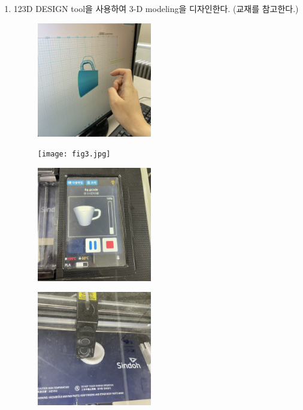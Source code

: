 \documentclass[a4paper, 10pt, nanum]{CSUniSchoolLabReport}
\begin{document}
\begin{enumerate}[label=\arabic*.]
	\item 123D DESIGN tool을 사용하여 3-D modeling을 디자인한다. (교재를 참고한다.)
	\begin{figure}[htb!]
		\centering
		\begin{minipage}{.5\textwidth}
			\centering
			\includegraphics[width=5cm]{fig2.jpg}
			\label{fig:2}
		\end{minipage}%
		\begin{minipage}{.5\textwidth}
			\centering
			\texttt{[image: fig3.jpg]}
			\label{fig:3}
		\end{minipage}
	\end{figure}
	\begin{figure}[htb!]
		\centering
		\begin{minipage}{.5\textwidth}
			\centering
			\includegraphics[width=5cm]{fig4.jpg}
			\label{fig:4}
		\end{minipage}%
		\begin{minipage}{.5\textwidth}
			\centering
			\includegraphics[width=5cm]{fig5.jpg}

\end{minipage}
\end{figure}
\end{enumerate}
\end{document}
